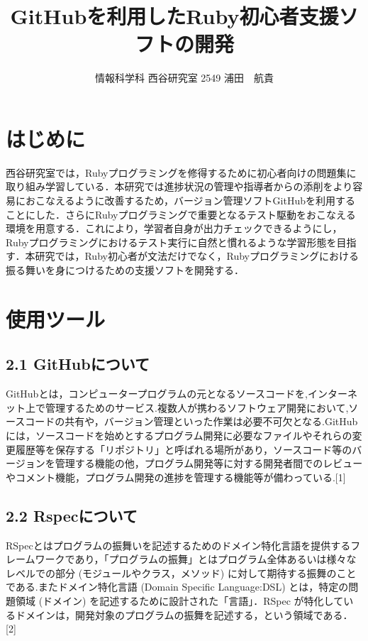 \documentclass[a4j,twocolumn,uplatex]{jsarticle}
\begin{document}
\title{GitHubを利用したRuby初心者支援ソフトの開発}
\author{情報科学科 西谷研究室 2549 浦田　航貴}
\date{}
\maketitle
\section{はじめに}
西谷研究室では，Rubyプログラミングを修得するために初心者向けの問題集に取り組み学習している．本研究では進捗状況の管理や指導者からの添削をより容易におこなえるように改善するため，バージョン管理ソフトGitHubを利用することにした．さらにRubyプログラミングで重要となるテスト駆動をおこなえる環境を用意する．これにより，学習者自身が出力チェックできるようにし，Rubyプログラミングにおけるテスト実行に自然と慣れるような学習形態を目指す．本研究では，Ruby初心者が文法だけでなく，Rubyプログラミングにおける振る舞いを身につけるための支援ソフトを開発する．

\section{使用ツール}
\subsection{2.1 GitHubについて}
GitHubとは，コンピュータープログラムの元となるソースコードを,インターネット上で管理するためのサービス.複数人が携わるソフトウェア開発において,ソースコードの共有や，バージョン管理といった作業は必要不可欠となる.GitHubには，ソースコードを始めとするプログラム開発に必要なファイルやそれらの変更履歴等を保存する「リポジトリ」と呼ばれる場所があり，ソースコード等のバージョンを管理する機能の他，プログラム開発等に対する開発者間でのレビューやコメント機能，プログラム開発の進捗を管理する機能等が備わっている.[1]

\subsection{2.2 Rspecについて}
RSpecとはプログラムの振舞いを記述するためのドメイン特化言語を提供するフレームワークであり，「プログラムの振舞」とはプログラム全体あるいは様々なレベルでの部分 (モジュールやクラス，メソッド) に対して期待する振舞のことである.またドメイン特化言語 (Domain Specific Language:DSL) とは，特定の問題領域 (ドメイン) を記述するために設計された「言語」．RSpec が特化しているドメインは，開発対象のプログラムの振舞を記述する，という領域である．[2]
\end{document}
